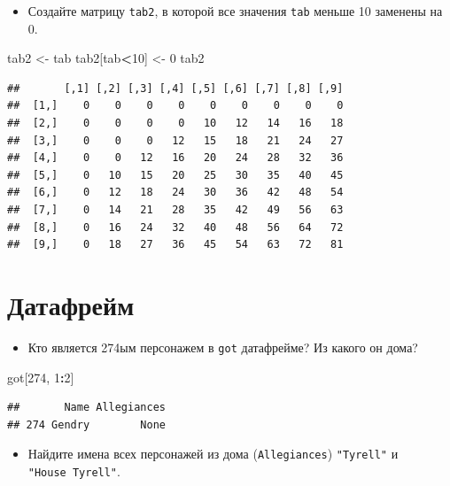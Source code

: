 \documentclass[]{book}
\newenvironment{Shaded}{\begin{snugshade}}{\end{snugshade}}
\newcommand{\DecValTok}[1]{\textcolor[rgb]{0.00,0.00,0.81}{#1}}
\newcommand{\NormalTok}[1]{#1}
\newcommand{\OperatorTok}[1]{\textcolor[rgb]{0.81,0.36,0.00}{\textbf{#1}}}
\newcommand{\StringTok}[1]{\textcolor[rgb]{0.31,0.60,0.02}{#1}}
\providecommand{\tightlist}{%
  \setlength{\itemsep}{0pt}\setlength{\parskip}{0pt}}
\begin{document}
\begin{itemize}
\tightlist
\item
  Создайте матрицу \texttt{tab2}, в которой все значения \texttt{tab} меньше 10 заменены на 0.
\end{itemize}

\begin{Shaded}
\begin{Highlighting}[]
\NormalTok{tab2 <-}\StringTok{ }\NormalTok{tab}
\NormalTok{tab2[tab}\OperatorTok{<}\DecValTok{10}\NormalTok{] <-}\StringTok{ }\DecValTok{0}
\NormalTok{tab2}
\end{Highlighting}
\end{Shaded}

\begin{verbatim}
##       [,1] [,2] [,3] [,4] [,5] [,6] [,7] [,8] [,9]
##  [1,]    0    0    0    0    0    0    0    0    0
##  [2,]    0    0    0    0   10   12   14   16   18
##  [3,]    0    0    0   12   15   18   21   24   27
##  [4,]    0    0   12   16   20   24   28   32   36
##  [5,]    0   10   15   20   25   30   35   40   45
##  [6,]    0   12   18   24   30   36   42   48   54
##  [7,]    0   14   21   28   35   42   49   56   63
##  [8,]    0   16   24   32   40   48   56   64   72
##  [9,]    0   18   27   36   45   54   63   72   81
\end{verbatim}

\hypertarget{solvdf_task}{%
\section{Датафрейм}\label{solvdf_task}}

\begin{itemize}
\tightlist
\item
  Кто является 274ым персонажем в \texttt{got} датафрейме? Из какого он дома?
\end{itemize}

\begin{Shaded}
\begin{Highlighting}[]
\NormalTok{got[}\DecValTok{274}\NormalTok{, }\DecValTok{1}\OperatorTok{:}\DecValTok{2}\NormalTok{]}
\end{Highlighting}
\end{Shaded}

\begin{verbatim}
##       Name Allegiances
## 274 Gendry        None
\end{verbatim}

\begin{itemize}
\tightlist
\item
  Найдите имена всех персонажей из дома (\texttt{Allegiances}) \texttt{"Tyrell"} и \texttt{"House\ Tyrell"}.
\end{itemize}
\end{document}
